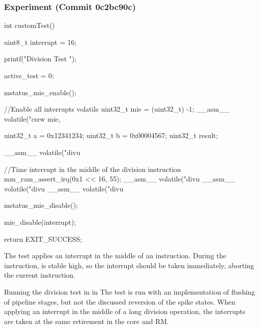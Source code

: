 

\subsubsection{Experiment (Commit 0c2bc90c)}

\begin{clisting}
int customTest() {
    uint8_t interrupt = 16;
    
    printf("Division Test \n");

    active_test = 0;

    mstatus_mie_enable();

    //Enable all interrupts
    volatile uint32_t mie = (uint32_t) -1;
    __asm__ volatile("csrw mie, %

    uint32_t a = 0x12341234;
    uint32_t b = 0x00004567;
    uint32_t result;

    __asm__ volatile("divu %

    //Time interrupt in the middle of the division instruction
    mm_ram_assert_irq(0x1 << 16, 55);
    __asm__ volatile("divu %
    __asm__ volatile("divu %
    __asm__ volatile("divu %

    mstatus_mie_disable();

    mie_disable(interrupt);

    return EXIT_SUCCESS;
}
\end{clisting}

The test applies an interrupt in the middle of an  instruction. During the instruction,  is stable high, so the interrupt should be taken immediately, aborting the current instruction.

Running the division test in  in  
The test is run with an implementation of flushing of pipeline stages, but not the discussed reversion of the spike states. 
When applying an interrupt in the middle of a long division operation, the interrupts are taken at the same retirement in the core and RM.

